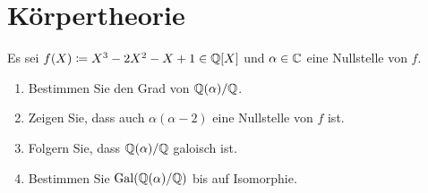 \section{Körpertheorie}




\begin{question}
  Es sei $f(X) \coloneqq X^3 - 2 X^2 - X + 1 \in \mathbb{Q}[X]$ und $\alpha \in \mathbb{C}$ eine Nullstelle von $f$.
  \begin{enumerate}
    \item
      Bestimmen Sie den Grad von $\mathbb{Q}(\alpha) / \mathbb{Q}$.
    \item
      Zeigen Sie, dass auch $\alpha(\alpha-2)$ eine Nullstelle von $f$ ist.
    \item
      Folgern Sie, dass $\mathbb{Q}(\alpha)/\mathbb{Q}$ galoisch ist.
    \item
      Bestimmen Sie $\operatorname{Gal}(\mathbb{Q}(\alpha)/\mathbb{Q})$ bis auf Isomorphie.
  \end{enumerate}
\end{question}


